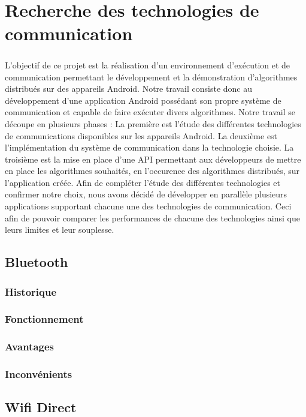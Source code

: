 \documentclass[a4paper,10pt]{report}
\begin{document}
  
\chapter{Recherche des technologies de communication}
  \paragraph{}
  L'objectif de ce projet est la réalisation d'un environnement d'exécution et de communication permettant le développement et la démonstration d'algorithmes distribués sur des appareils Android. Notre travail consiste donc au développement d'une application Android possédant son propre système de communication et capable de faire exécuter divers algorithmes.
  Notre travail se découpe en plusieurs phases :
  La première est l'étude des différentes technologies de communications disponibles sur les appareils Android.
  La deuxième est l'implémentation du système de communication dans la technologie choisie.
  La troisième est la mise en place d'une API permettant aux développeurs de mettre en place les algorithmes souhaités, en l'occurence des algorithmes distribués, sur l'application créée.
  Afin de compléter l'étude des différentes technologies et confirmer notre choix, nous avons décidé de développer en parallèle plusieurs applications supportant chacune une des technologies de communication. Ceci afin de pouvoir comparer les performances de chacune des technologies ainsi que leurs limites et leur souplesse.
  \section{Bluetooth}
    \subsection{Historique}
    \subsection{Fonctionnement} 
    \subsection{Avantages}
    \subsection{Inconvénients}
  \section{Wifi Direct}
\end{document}
